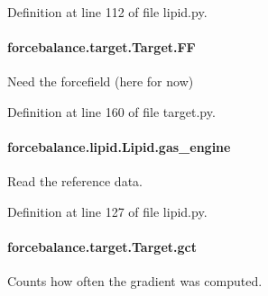 Definition at line 112 of file lipid.\-py.

\hypertarget{classforcebalance_1_1target_1_1Target_a38a37919783141ea37fdcf8b00ce0aaf}{
\paragraph[{F\-F}]{\setlength{\rightskip}{0pt plus 5cm}forcebalance.\-target.\-Target.\-F\-F\hspace{0.3cm}{\ttfamily [inherited]}}}\label{classforcebalance_1_1target_1_1Target_a38a37919783141ea37fdcf8b00ce0aaf}


Need the forcefield (here for now) 



Definition at line 160 of file target.\-py.

\hypertarget{classforcebalance_1_1lipid_1_1Lipid_ad64df596db06f1dbdf49e0acca65534f}{
\paragraph[{gas\-\_\-engine}]{\setlength{\rightskip}{0pt plus 5cm}forcebalance.\-lipid.\-Lipid.\-gas\-\_\-engine}}\label{classforcebalance_1_1lipid_1_1Lipid_ad64df596db06f1dbdf49e0acca65534f}


Read the reference data. 



Definition at line 127 of file lipid.\-py.

\hypertarget{classforcebalance_1_1target_1_1Target_aa625ac88c6744eb14ef281d9496d0dbb}{
\paragraph[{gct}]{\setlength{\rightskip}{0pt plus 5cm}forcebalance.\-target.\-Target.\-gct\hspace{0.3cm}{\ttfamily [inherited]}}}\label{classforcebalance_1_1target_1_1Target_aa625ac88c6744eb14ef281d9496d0dbb}


Counts how often the gradient was computed. 



